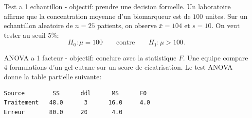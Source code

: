 \begin{questions}
\pageblanche
\question[8] Test a 1 echantillon - objectif: prendre une decision formelle.
Un laboratoire affirme que la concentration moyenne d'un biomarqueur est de $100$ unites.
Sur un echantillon aleatoire de $n=25$ patients, on observe $\bar{x}=104$ et $s=10$.
On veut tester au seuil $5\%$:
\[
H_0:\mu=100\qquad\text{contre}\qquad H_1:\mu>100.
\]

\pageblanche
\question[8] ANOVA a 1 facteur - objectif: conclure avec la statistique $F$.
Une equipe compare 4 formulations d'un gel cutane sur un score de cicatrisation.
Le test ANOVA donne la table partielle suivante:
\begin{verbatim}
Source        SS      ddl      MS      F0
Traitement   48.0      3      16.0     4.0
Erreur       80.0     20       4.0
\end{verbatim}
\end{questions}
